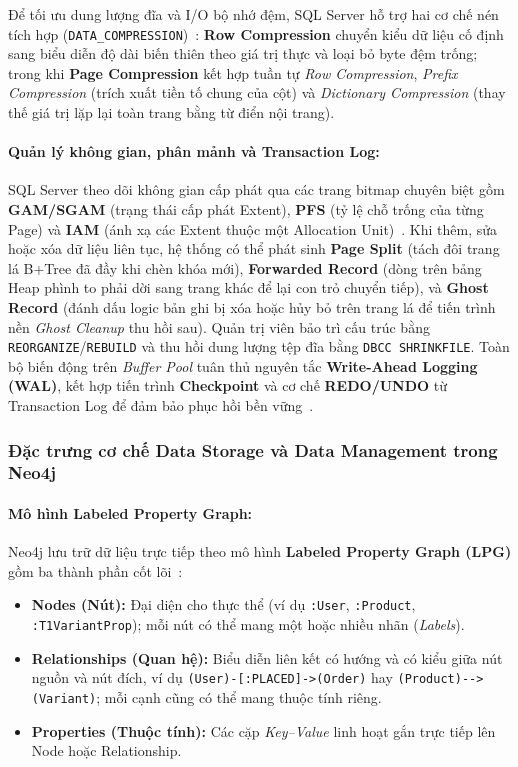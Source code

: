 Để tối ưu dung lượng đĩa và I/O bộ nhớ đệm, SQL Server hỗ trợ hai cơ chế nén tích hợp (\texttt{DATA\_COMPRESSION})~\cite{t1_mscomp}: \textbf{Row Compression} chuyển kiểu dữ liệu cố định sang biểu diễn độ dài biến thiên theo giá trị thực và loại bỏ byte đệm trống; trong khi \textbf{Page Compression} kết hợp tuần tự \textit{Row Compression}, \textit{Prefix Compression} (trích xuất tiền tố chung của cột) và \textit{Dictionary Compression} (thay thế giá trị lặp lại toàn trang bằng từ điển nội trang).

\paragraph{Quản lý không gian, phân mảnh và Transaction Log:}
SQL Server theo dõi không gian cấp phát qua các trang bitmap chuyên biệt gồm \textbf{GAM/SGAM} (trạng thái cấp phát Extent), \textbf{PFS} (tỷ lệ chỗ trống của từng Page) và \textbf{IAM} (ánh xạ các Extent thuộc một Allocation Unit)~\cite{t1_mspages}. Khi thêm, sửa hoặc xóa dữ liệu liên tục, hệ thống có thể phát sinh \textbf{Page Split} (tách đôi trang lá B+Tree đã đầy khi chèn khóa mới), \textbf{Forwarded Record} (dòng trên bảng Heap phình to phải dời sang trang khác để lại con trỏ chuyển tiếp), và \textbf{Ghost Record} (đánh dấu logic bản ghi bị xóa hoặc hủy bỏ trên trang lá để tiến trình nền \textit{Ghost Cleanup} thu hồi sau). Quản trị viên bảo trì cấu trúc bằng \texttt{REORGANIZE}/\texttt{REBUILD} và thu hồi dung lượng tệp đĩa bằng \texttt{DBCC SHRINKFILE}. Toàn bộ biến động trên \textit{Buffer Pool} tuân thủ nguyên tắc \textbf{Write-Ahead Logging (WAL)}, kết hợp tiến trình \textbf{Checkpoint} và cơ chế \textbf{REDO/UNDO} từ Transaction Log để đảm bảo phục hồi bền vững~\cite{t1_delaney2012}.

\subsubsection{Đặc trưng cơ chế Data Storage và Data Management trong Neo4j}

\paragraph{Mô hình Labeled Property Graph:}
Neo4j lưu trữ dữ liệu trực tiếp theo mô hình \textbf{Labeled Property Graph (LPG)} gồm ba thành phần cốt lõi~\cite{t1_robinson2015,t1_neo4jops}:
\begin{itemize}
  \item \textbf{Nodes (Nút):} Đại diện cho thực thể (ví dụ \texttt{:User}, \texttt{:Product}, \texttt{:T1VariantProp}); mỗi nút có thể mang một hoặc nhiều nhãn (\textit{Labels}).
  \item \textbf{Relationships (Quan hệ):} Biểu diễn liên kết có hướng và có kiểu giữa nút nguồn và nút đích, ví dụ \texttt{(User)-[:PLACED]->(Order)} hay \texttt{(Product)-->\allowbreak(Variant)}; mỗi cạnh cũng có thể mang thuộc tính riêng.
  \item \textbf{Properties (Thuộc tính):} Các cặp \textit{Key--Value} linh hoạt gắn trực tiếp lên Node hoặc Relationship.
\end{itemize}

